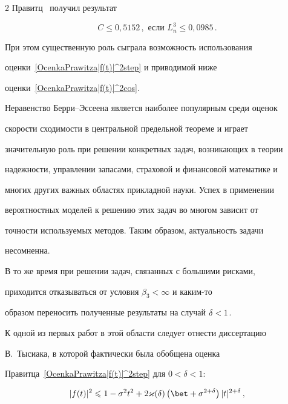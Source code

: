 \begin{multicols}{2}
Правитц~\cite{Prawitz1975} получил результат

\begin{equation}

\label{PrawitzAsymptBEconst}

C\le0{,}5152\,, \mbox{ если } L_n^3\le 0{,}0985\,.

\end{equation}

При этом существенную роль сыграла возможность использования

оценки~\eqref{OcenkaPrawitza|f(t)|^2step} и приводимой ниже

оценки~\eqref{OcenkaPrawitza|f(t)|^2cos}.



Неравенство Берри--Эссеена является наиболее популярным среди оценок

скорости сходимости в центральной предельной теореме и играет

значительную роль при решении конкретных задач, возникающих в теории

надежности, управлении запасами, страховой и финансовой математике и

многих других важных областях прикладной науки. Успех в применении

вероятностных моделей к решению этих задач во многом зависит от

точности используемых методов. Таким образом, актуальность задачи

несомненна.



В то же время при решении задач, связанных с большими рисками,

приходится отказываться от условия $\beta_3<\infty$ и каким-то

образом переносить полученные результаты на случай ${\delta<1}$.



К одной из первых работ в этой области следует отнести диссертацию

В.~Тысиака, в которой фактически  была обобщена оценка

Правитца~\eqref{OcenkaPrawitza|f(t)|^2step} для $0<\delta<1$:

\begin{multline}

\label{OcenkaTysiaka1983|f(t)|^2}

|f(t)|^2\le1-\sigma^2t^2+

2\varkappa(\d)\left(\bet+\sigma^{2+\d}\right)|t|^{2+\d}\,,\\


\end{multline}
\end{multicols}
